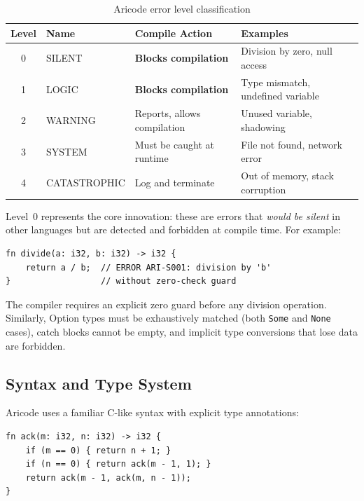 \documentclass[11pt,a4paper]{article}
\begin{document}
\begin{table}[H]
\centering
\caption{Aricode error level classification}
\label{tab:error_levels}
\begin{tabular}{@{}clll@{}}
\toprule
\textbf{Level} & \textbf{Name} & \textbf{Compile Action} & \textbf{Examples} \\
\midrule
0 & SILENT      & \textbf{Blocks compilation}    & Division by zero, null access \\
1 & LOGIC       & \textbf{Blocks compilation}    & Type mismatch, undefined variable \\
2 & WARNING     & Reports, allows compilation    & Unused variable, shadowing \\
3 & SYSTEM      & Must be caught at runtime      & File not found, network error \\
4 & CATASTROPHIC & Log and terminate             & Out of memory, stack corruption \\
\bottomrule
\end{tabular}
\end{table}

Level~0 represents the core innovation: these are errors that \emph{would be silent} in other languages but are detected and forbidden at compile time. For example:

\begin{lstlisting}[caption={Level~0 error: unguarded division}]
fn divide(a: i32, b: i32) -> i32 {
    return a / b;  // ERROR ARI-S001: division by 'b'
}                  // without zero-check guard
\end{lstlisting}

The compiler requires an explicit zero guard before any division operation. Similarly, Option types must be exhaustively matched (both \texttt{Some} and \texttt{None} cases), catch blocks cannot be empty, and implicit type conversions that lose data are forbidden.

\subsection{Syntax and Type System}

Aricode uses a familiar C-like syntax with explicit type annotations:

\begin{lstlisting}[caption={Aricode function syntax}]
fn ack(m: i32, n: i32) -> i32 {
    if (m == 0) { return n + 1; }
    if (n == 0) { return ack(m - 1, 1); }
    return ack(m - 1, ack(m, n - 1));
}
\end{lstlisting}
\end{document}
